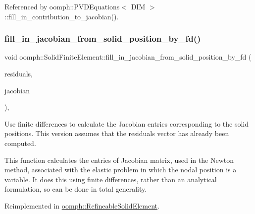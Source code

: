 Referenced by oomph\+::\+P\+V\+D\+Equations$<$ D\+I\+M $>$\+::fill\+\_\+in\+\_\+contribution\+\_\+to\+\_\+jacobian().

\mbox{\label{classoomph_1_1SolidFiniteElement_aa4d7dab326ceb0167da34ad4c535fa0d}} 
\subsubsection{\texorpdfstring{fill\+\_\+in\+\_\+jacobian\+\_\+from\+\_\+solid\+\_\+position\+\_\+by\+\_\+fd()}{fill\_in\_jacobian\_from\_solid\_position\_by\_fd()}\hspace{0.1cm}{\footnotesize\ttfamily [1/2]}}
{\footnotesize\ttfamily void oomph\+::\+Solid\+Finite\+Element\+::fill\+\_\+in\+\_\+jacobian\+\_\+from\+\_\+solid\+\_\+position\+\_\+by\+\_\+fd (\begin{DoxyParamCaption}\item[{\hyperlink{classoomph_1_1Vector}{Vector}$<$ double $>$ \&}]{residuals,  }\item[{\hyperlink{classoomph_1_1DenseMatrix}{Dense\+Matrix}$<$ double $>$ \&}]{jacobian }\end{DoxyParamCaption})\hspace{0.3cm}{\ttfamily [protected]}, {\ttfamily [virtual]}}



Use finite differences to calculate the Jacobian entries corresponding to the solid positions. This version assumes that the residuals vector has already been computed. 

This function calculates the entries of Jacobian matrix, used in the Newton method, associated with the elastic problem in which the nodal position is a variable. It does this using finite differences, rather than an analytical formulation, so can be done in total generality. 

Reimplemented in \hyperlink{classoomph_1_1RefineableSolidElement_a97f911c422af3e4fbd078b58cfe3e207}{oomph\+::\+Refineable\+Solid\+Element}.



